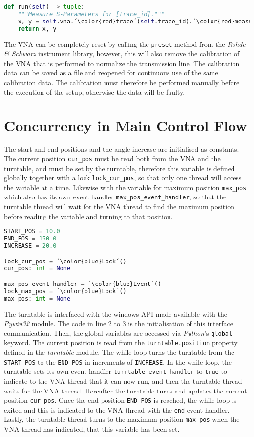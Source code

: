\begin{lstlisting}[language=Python, caption=Method for getting measurements from VNA.]
def run(self) -> tuple:
    """Measure S-Parameters for [trace_id]."""
    x, y = self.vna.´\color{red}trace´(self.trace_id).´\color{red}measure\_formatted\_data´()
    return x, y
\end{lstlisting}

The VNA can be completely reset by calling the \verb+preset+ method from the \textit{Rohde \& Schwarz} instrument library, however, this will also remove the calibration of the VNA that is performed to normalize the transmission line. The calibration data can be saved as a file and reopened for continuous use of the same calibration data. The calibration must therefore be performed manually before the execution of the setup, otherwise the data will be faulty.

\section{Concurrency in Main Control Flow}
The start and end positions and the angle increase are initialised as constants. The current position \verb+cur_pos+ must be read both from the VNA and the turntable, and must be set by the turntable, therefore this variable is defined globally together with a lock \verb+lock_cur_pos+, so that only one thread will access the variable at a time. Likewise with the variable for maximum position \verb+max_pos+ which also has its own event handler \verb+max_pos_event_handler+, so that the turntable thread will wait for the VNA thread to find the maximum position before reading the variable and turning to that position.
\begin{lstlisting}[language=Python, caption=Global constants and variables.]
START_POS = 10.0
END_POS = 150.0
INCREASE = 20.0

lock_cur_pos = ´\color{blue}Lock´()
cur_pos: int = None

max_pos_event_handler = ´\color{blue}Event´()
lock_max_pos = ´\color{blue}Lock´()
max_pos: int = None
\end{lstlisting}

The turntable is interfaced with the windows API made available with the \textit{Pywin32} module. The code in line 2 to 3 is the initialisation of this interface communication. Then, the global variables are accessed via \textit{Python}'s \verb+global+ keyword. The current position is read from the \verb+turntable.position+ property defined in the \textit{turntable} module. The while loop turns the turntable from the \verb+START_POS+ to the \verb+END_POS+ in increments of \verb+INCREASE+. In the while loop, the turntable sets its own event handler \verb+turntable_event_handler+ to \verb+true+ to indicate to the VNA thread that it can now run, and then the turntable thread waits for the VNA thread. Hereafter the turntable turns and updates the current position \verb+cur_pos+. Once the end position \verb+END_POS+ is reached, the while loop is exited and this is indicated to the VNA thread with the \verb+end+ event handler. Lastly, the turntable thread turns to the maximum position \verb+max_pos+ when the VNA thread has indicated, that this variable has been set. 

